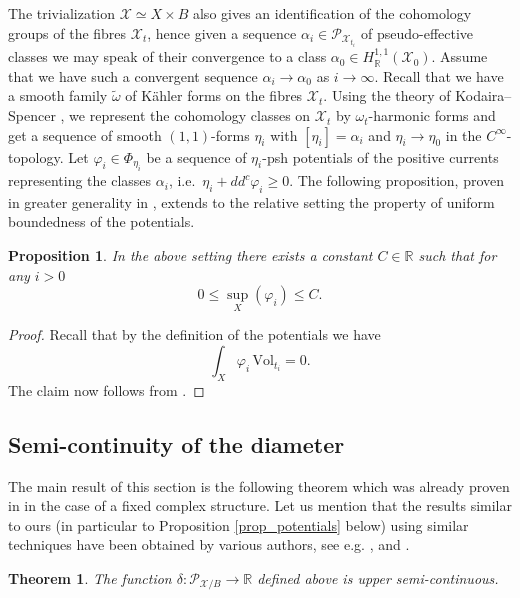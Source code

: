 \documentclass[11pt]{article}
\newcommand{\6}{\partial}
\newcommand{\bbR}{\mathbb{R}}
\newcommand{\PP}{\mathcal{P}}
\newcommand{\XX}{\mathcal{X}}
\renewcommand{\ge}{\geqslant}
\renewcommand{\le}{\leqslant}
\newcommand{\Vol}{\mathrm{Vol}}
\newtheorem{prop}[defn]{Proposition}
\newtheorem{thm}[defn]{Theorem}
\begin{document}
The trivialization $\XX\simeq X\times B$ also gives an identification of the cohomology
groups of the fibres $\XX_t$, hence given a sequence $\alpha_{i}\in\PP_{\XX_{t_i}}$
of pseudo-effective classes we may speak of their convergence to a class $\alpha_0\in H^{1,1}_\bbR(\XX_0)$.
Assume that we have such a convergent sequence $\alpha_i\to \alpha_0$ as $i\to\infty$.
Recall that we have a smooth family $\tilde{\omega}$ of K\"ahler forms
on the fibres $\XX_t$. Using the theory of Kodaira--Spencer \cite{KS}, we represent the cohomology
classes on $\XX_t$ by $\omega_t$-harmonic forms and get a sequence of smooth $(1,1)$-forms
$\eta_{i}$ with $[\eta_{i}] = \alpha_{i}$ and $\eta_{i}\to \eta_0$ in the $C^\infty$-topology.
Let $\varphi_i\in \Phi_{\eta_{i}}$ be a sequence of $\eta_i$-psh potentials of the positive currents representing
the classes $\alpha_i$, i.e.\ $\eta_i + dd^c\varphi_i \ge 0$. The following proposition,
proven in greater generality in \cite{DGG}, extends to the relative setting the property
of uniform boundedness of the potentials.

\begin{prop}\label{prop_bounded}
In the above setting there exists a constant $C\in\bbR$ such that for any $i> 0$
$$
0\le \sup_X(\varphi_i) \le C.
$$
\end{prop}

\begin{proof}
Recall that by the definition of the potentials we have
$$
\int_X \varphi_i \, \Vol_{t_i} = 0.
$$
The claim now follows from \cite[Proposition 3.3]{DGG}.
\end{proof}


\subsection{Semi-continuity of the diameter}

The main result of this section is the following theorem
which was already proven in \cite[Lemma 6.4]{_Cantat_Dujardin:random_}
in the case of a fixed complex structure. Let us mention that
the results similar to ours (in particular to Proposition \ref{prop_potentials} below)
using similar techniques have been obtained by various authors, see
e.g. \cite[Proposition 6.6]{BGL}, \cite[Sections 2 and 3]{DGG} and \cite[Section 2]{PT}.

\begin{thm}\label{thm_diam}
The function $\delta\colon \PP_{\XX/B}\to \bbR$ defined above is upper semi-continuous.
\end{thm}
\end{document}
